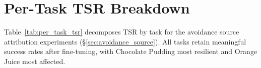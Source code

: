 \begin{table}[h]
\centering
\caption{dfCAR (\%) across displacement thresholds for fine-tuned Pi0.5 configurations ($n = 200$ episodes per seed). Values are identical across $\tau_d \in [2, 200]$\,mm; at $\tau_d = 300$\,mm, at most 2 episodes are excluded.}
\label{tab:dfcar_threshold}
\vspace{2pt}
\footnotesize
{}
\end{table}


\section{Per-Task TSR Breakdown}\label{sec:appendix_tsr_pertask}

Table~\ref{tab:per_task_tsr} decomposes TSR by task for the avoidance source attribution experiments (\S\ref{sec:avoidance_source}). All tasks retain meaningful success rates after fine-tuning, with Chocolate Pudding most resilient and Orange Juice most affected.

